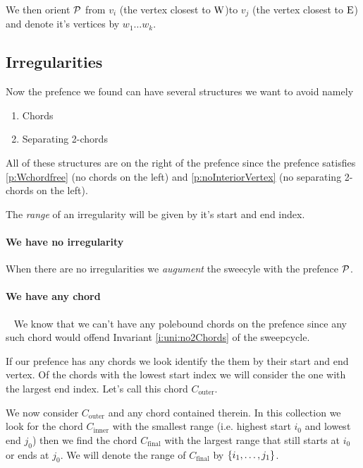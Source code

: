     We then orient $\P$ from $v_i$ (the vertex closest to $\pW$)to $v_j$ (the vertex closest to $\pE$) and denote it's vertices by $w_1 \ldots w_k$.

  \subsection{Irregularities}
    Now the prefence we found can have several structures we want to avoid
    namely
    \begin{enumerate}
      \itemsep=-4pt
      \item Chords
      \item Separating 2-chords
    \end{enumerate}

    All of these structures are on the right of the prefence since the prefence satisfies \ref{p:Wchordfree} (no chords on the left) and \ref{p:noInteriorVertex} (no separating 2-chords on the left).

    The \emph{range} of an irregularity will be given by it's start and end index.

    \paragraph{We have no irregularity}
      When there are no irregularities we \emph{augument} the sweecyle with the prefence $\P$.

    \paragraph{We have any chord} \mbox{ }
    We know that we can't have any polebound chords on the prefence since any such chord would offend Invariant \ref{i:uni:no2Chords} of the sweepcycle.

    If our prefence has any chords we look identify the them by their start and end vertex. Of the chords with the lowest start index we will consider the one with the largest end index. Let's call this chord $C_\text{outer}$.

    We now consider $C_\text{outer}$ and any chord contained therein. In this collection we look for the chord $C_\text{inner}$ with the smallest range (i.e. highest start $i_0$ and lowest end $j_0$) then we find the chord $C_\text{final}$ with the largest range that still starts at $i_0$ or ends at $j_0$. We will denote the range of $C_\text{final}$ by $\braces{i_1, \ldots, j_1}$.

